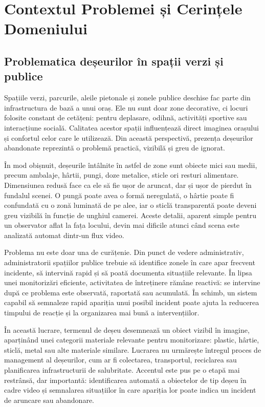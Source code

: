\chapter{Contextul Problemei și Cerințele Domeniului}

\section{Problematica deșeurilor în spații verzi și publice}

Spațiile verzi, parcurile, aleile pietonale și zonele publice deschise fac parte din infrastructura de bază a unui oraș. Ele nu sunt doar zone decorative, ci locuri folosite constant de cetățeni: pentru deplasare, odihnă, activități sportive sau interacțiune socială. Calitatea acestor spații influențează direct imaginea orașului și confortul celor care le utilizează. Din această perspectivă, prezența deșeurilor abandonate reprezintă o problemă practică, vizibilă și greu de ignorat.

În mod obișnuit, deșeurile întâlnite în astfel de zone sunt obiecte mici sau medii, precum ambalaje, hârtii, pungi, doze metalice, sticle ori resturi alimentare. Dimensiunea redusă face ca ele să fie ușor de aruncat, dar și ușor de pierdut în fundalul scenei. O pungă poate avea o formă neregulată, o hârtie poate fi confundată cu o zonă luminată de pe alee, iar o sticlă transparentă poate deveni greu vizibilă în funcție de unghiul camerei. Aceste detalii, aparent simple pentru un observator aflat la fața locului, devin mai dificile atunci când scena este analizată automat dintr-un flux video.

Problema nu este doar una de curățenie. Din punct de vedere administrativ, administratorii spațiilor publice trebuie să identifice zonele în care apar frecvent incidente, să intervină rapid și să poată documenta situațiile relevante. În lipsa unei monitorizări eficiente, activitatea de întreținere rămâne reactivă: se intervine după ce problema este observată, raportată sau acumulată. În schimb, un sistem capabil să semnaleze rapid apariția unui posibil incident poate ajuta la reducerea timpului de reacție și la organizarea mai bună a intervențiilor.

În această lucrare, termenul de deșeu desemnează un obiect vizibil în imagine, aparținând unei categorii materiale relevante pentru monitorizare: plastic, hârtie, sticlă, metal sau alte materiale similare. Lucrarea nu urmărește întregul proces de management al deșeurilor, cum ar fi colectarea, transportul, reciclarea sau planificarea infrastructurii de salubritate. Accentul este pus pe o etapă mai restrânsă, dar importantă: identificarea automată a obiectelor de tip deșeu în cadre video și semnalarea situațiilor în care apariția lor poate indica un incident de aruncare sau abandonare.

